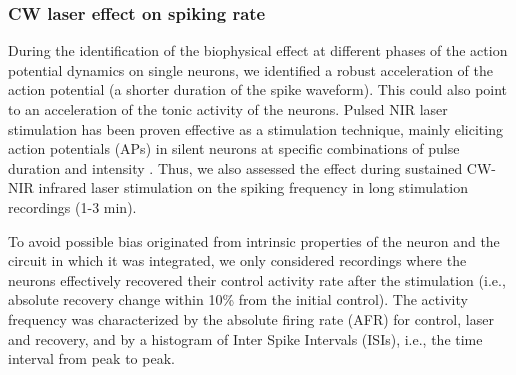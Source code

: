 \subsubsection{CW laser effect on spiking rate}
During the identification of the biophysical effect at different phases of the action potential dynamics on single neurons, we identified a robust acceleration of the action potential (a shorter duration of the spike waveform). This could also point to an acceleration of the tonic activity of the neurons. Pulsed NIR laser stimulation has been proven effective as a stimulation technique, mainly eliciting action potentials (APs) in silent neurons at specific combinations of pulse duration and intensity \parencite{Wells2005, Shapiro2012, Izzo2007, Cayce2014}. Thus, we also assessed the effect during sustained CW-NIR infrared laser stimulation on the spiking frequency in long stimulation recordings (1-3 min). 

To avoid possible bias originated from intrinsic properties of the neuron and the circuit in which it was integrated, we only considered recordings where the neurons effectively recovered their control activity rate after the stimulation (i.e., absolute recovery change within 10\% from the initial control). The activity frequency was characterized by the absolute firing rate (AFR) for control, laser and recovery, and by a histogram of Inter Spike Intervals (ISIs), i.e., the time interval from peak to peak.

